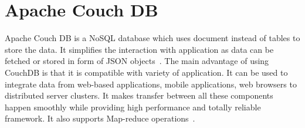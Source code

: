 \section{Apache Couch DB}

Apache Couch DB is a NoSQL database which uses document instead of tables to
store the data. It simplifies the interaction with application as data can be
fetched or stored in form of JSON objects~\cite{hid-sp18-502-ApacheCouchDB}.
The main advantage of using CouchDB is that it is compatible with variety of
application. It can be used to integrate data from web-based applications,
mobile applications, web browsers to distributed server clusters. It makes
transfer between all these components happen smoothly while providing high
performance and totally reliable framework. It also supports Map-reduce
operations~\cite{hid-sp18-502-ApacheCouchDB}.
